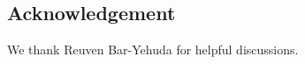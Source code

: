 \documentclass[11pt]{article}
\begin{document}

\subsection*{Acknowledgement}

We thank Reuven Bar-Yehuda for helpful discussions.




\end{document}
